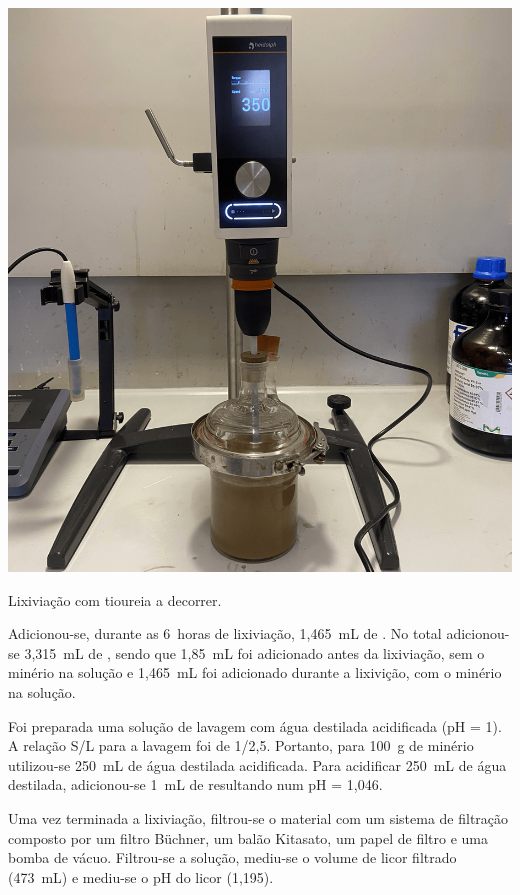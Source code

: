 \begin{marginfigure}
    \centering
    \includegraphics[width=0.9\linewidth]{figures/Lixiviação - Tioureia}
    \caption{Lixiviação com tioureia a decorrer.}
    \label{fig:lix-tioureia-a-decorrer}
\end{marginfigure}

Adicionou-se, durante as 6~horas de lixiviação, 1,465~mL de \acsul{}.
No total adicionou-se 3,315~mL de \acsul{}, sendo que 1,85~mL foi adicionado antes da lixiviação, sem o minério na solução e 1,465~mL foi adicionado durante a lixivição, com o minério na solução.

Foi preparada uma solução de lavagem com água destilada acidificada (pH = 1).
A relação S/L para a lavagem foi de 1/2,5. 
Portanto, para 100~g de minério utilizou-se 250~mL de água destilada acidificada.
Para acidificar 250~mL de água destilada, adicionou-se 1~mL de \acsul{} resultando num pH = 1,046.

Uma vez terminada a lixiviação, filtrou-se o material com um sistema de filtração composto por um filtro Büchner, um balão Kitasato, um papel de filtro e uma bomba de vácuo. 
Filtrou-se a solução, mediu-se o volume de licor filtrado (473~mL) e mediu-se o pH do licor (1,195).

